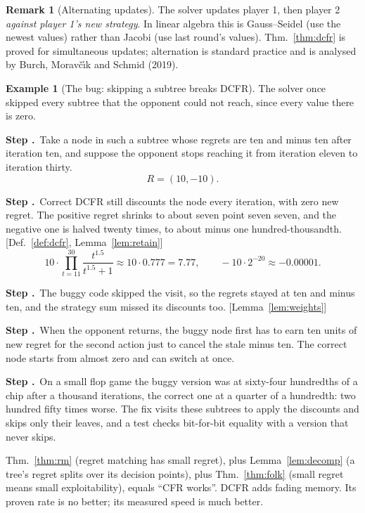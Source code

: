 \documentclass[11pt]{article}
\theoremstyle{definition}
\newtheorem{example}[definition]{Example}
\newtheorem{remark}[definition]{Remark}
\newcounter{stp}
\newcommand{\steps}{\setcounter{stp}{0}}
\newcommand{\st}{\stepcounter{stp}\par\medskip\noindent\textbf{Step \arabic{stp}.}\ }
\newcommand{\by}[1]{\hfill{\small\color{blue!50!black}[#1]}}
\newcommand{\Def}[1]{Def.~\ref{#1}}\newcommand{\Lem}[1]{Lemma~\ref{#1}}\newcommand{\Thm}[1]{Thm.~\ref{#1}}
\begin{document}
\begin{remark}[Alternating updates]\label{rem:alt}
The solver updates player 1, then player 2 \emph{against player 1's new strategy}. In linear algebra this is Gauss--Seidel
(use the newest values) rather than Jacobi (use last round's values). \Thm{thm:dcfr} is proved for simultaneous updates;
alternation is standard practice and is analysed by Burch, Morav\v{c}\'{\i}k and Schmid (2019).
\end{remark}

\begin{example}[The bug: skipping a subtree breaks DCFR]\label{ex:bug}
The solver once skipped every subtree that the opponent could not reach, since every value there is zero.
\steps
\st Take a node in such a subtree whose regrets are ten and minus ten after iteration ten, and suppose the opponent stops
reaching it from iteration eleven to iteration thirty.
\[ R=(10,-10). \]
\st Correct DCFR still discounts the node every iteration, with zero new regret. The positive regret shrinks to about
seven point seven seven, and the negative one is halved twenty times, to about minus one hundred-thousandth.
\by{\Def{def:dcfr}, \Lem{lem:retain}}
\[ 10\cdot\prod_{t=11}^{30}\frac{t^{1.5}}{t^{1.5}+1}\approx10\cdot0.777=7.77,\qquad -10\cdot2^{-20}\approx-0.00001. \]
\st The buggy code skipped the visit, so the regrets stayed at ten and minus ten, and the strategy sum missed its
discounts too. \by{\Lem{lem:weights}}
\st When the opponent returns, the buggy node first has to earn ten units of new regret for the second action just to
cancel the stale minus ten. The correct node starts from almost zero and can switch at once.
\st On a small flop game the buggy version was at sixty-four hundredths of a chip after a thousand iterations, the correct
one at a quarter of a hundredth: two hundred fifty times worse. The fix visits these subtrees to apply the discounts and
skips only their leaves, and a test checks bit-for-bit equality with a version that never skips.
\end{example}

\begin{takeaway}
\Thm{thm:rm} (regret matching has small regret), plus \Lem{lem:decomp} (a tree's regret splits over its decision points),
plus \Thm{thm:folk} (small regret means small exploitability), equals ``CFR works''. DCFR adds fading memory. Its proven
rate is no better; its measured speed is much better.
\end{takeaway}

\end{document}
